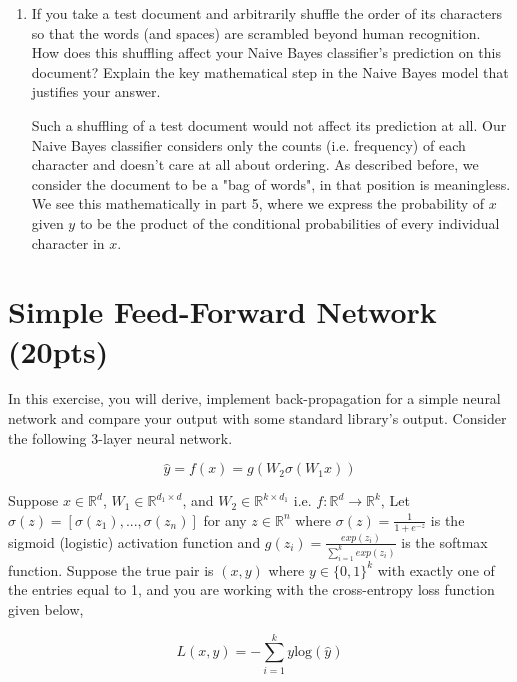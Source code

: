 \documentclass[a4paper]{article}
\theoremstyle{definition}
\newenvironment{soln}{
    \leavevmode\color{blue}\ignorespaces
}{}
\begin{document}
\begin{enumerate}
\item If you take a test document and arbitrarily shuffle the order of its characters so that the words (and spaces) are scrambled beyond human recognition.  How does this shuffling affect your Naive Bayes classifier's prediction on this document?  Explain the key mathematical step in the Naive Bayes model that justifies your answer.

\begin{soln}
	Such a shuffling of a test document would not affect its prediction at all. Our Naive Bayes classifier considers only the counts (i.e. frequency) of each character and doesn't care at all about ordering. As described before, we consider the document to be a "bag of words", in that position is meaningless. We see this mathematically in part 5, where we express the probability of $x$ given $y$ to be the product of the conditional probabilities of every individual character in $x$.
\end{soln}

\end{enumerate}

\section{Simple Feed-Forward Network (20pts)}
In this exercise, you will derive, implement back-propagation for a simple neural network and compare your output with some standard library’s output. Consider the following 3-layer neural network.

\[
\hat{y} = f(x) = g(W_2\sigma(W_1x))
\]

Suppose $x \in \mathbb{R}^d$, $W_1 \in \mathbb{R}^{d_1 \times d}$, and $W_2 \in \mathbb{R}^{k \times d_1}$ i.e. $f: \mathbb{R}^d \rightarrow \mathbb{R}^k$, Let $\sigma(z) = [\sigma(z_1), ..., \sigma(z_n)]$ for any $z \in \mathbb{R}^n$ where $\sigma(z) = \frac{1}{1 + e^{-z}}$ is the sigmoid (logistic) activation function and $g(z_i) = \frac{exp(z_i)}{\sum_{i=1}^k exp(z_i)}$ is the softmax function. Suppose the true pair is $(x, y)$ where $y \in \{0, 1\}^k$ with exactly one of the entries equal to 1, and you are working with the cross-entropy loss function given below,

\[
L(x, y) = -\sum_{i=1}^k y \text{log}(\hat{y})
\]
\end{document}
